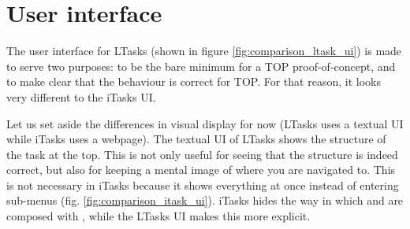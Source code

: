 \section{User interface}
The user interface for LTasks (shown in figure \ref{fig:comparison_ltask_ui}) is made to serve two purposes: to be the bare minimum for a TOP proof-of-concept, and to make clear that the behaviour is correct for TOP. For that reason, it looks very different to the iTasks UI.

Let us set aside the differences in visual display for now (LTasks uses a textual UI while iTasks uses a webpage). The textual UI of LTasks shows the structure of the task at the top. This is not only useful for seeing that the structure is indeed correct, but also for keeping a mental image of where you are navigated to. This is not necessary in iTasks because it shows everything at once instead of entering sub-menus (fig. \ref{fig:comparison_itask_ui}). iTasks hides the way in which  and  are composed with , while the LTasks UI makes this more explicit.

